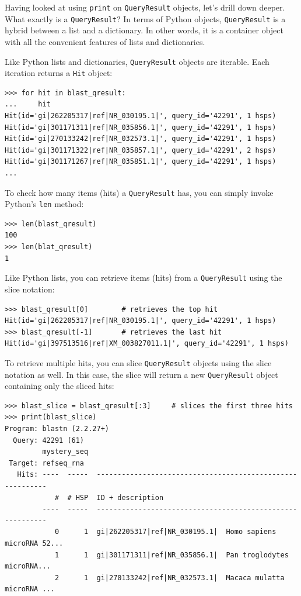 \documentclass{report}
\begin{document}
Having looked at using \verb|print| on \verb|QueryResult| objects, let's drill
down deeper. What exactly is a \verb|QueryResult|? In terms of Python objects,
\verb|QueryResult| is a hybrid between a list and a dictionary. In other words,
it is a container object with all the convenient features of lists and
dictionaries.

Like Python lists and dictionaries, \verb|QueryResult| objects are iterable.
Each iteration returns a \verb|Hit| object:

\begin{verbatim}
>>> for hit in blast_qresult:
...     hit
Hit(id='gi|262205317|ref|NR_030195.1|', query_id='42291', 1 hsps)
Hit(id='gi|301171311|ref|NR_035856.1|', query_id='42291', 1 hsps)
Hit(id='gi|270133242|ref|NR_032573.1|', query_id='42291', 1 hsps)
Hit(id='gi|301171322|ref|NR_035857.1|', query_id='42291', 2 hsps)
Hit(id='gi|301171267|ref|NR_035851.1|', query_id='42291', 1 hsps)
...
\end{verbatim}

To check how many items (hits) a \verb|QueryResult| has, you can simply invoke
Python's \verb|len| method:

\begin{verbatim}
>>> len(blast_qresult)
100
>>> len(blat_qresult)
1
\end{verbatim}

Like Python lists, you can retrieve items (hits) from a \verb|QueryResult| using
the slice notation:

\begin{verbatim}
>>> blast_qresult[0]        # retrieves the top hit
Hit(id='gi|262205317|ref|NR_030195.1|', query_id='42291', 1 hsps)
>>> blast_qresult[-1]       # retrieves the last hit
Hit(id='gi|397513516|ref|XM_003827011.1|', query_id='42291', 1 hsps)
\end{verbatim}

To retrieve multiple hits, you can slice \verb|QueryResult| objects using the
slice notation as well. In this case, the slice will return a new
\verb|QueryResult| object containing only the sliced hits:

\begin{verbatim}
>>> blast_slice = blast_qresult[:3]     # slices the first three hits
>>> print(blast_slice)
Program: blastn (2.2.27+)
  Query: 42291 (61)
         mystery_seq
 Target: refseq_rna
   Hits: ----  -----  ----------------------------------------------------------
            #  # HSP  ID + description                                          
         ----  -----  ----------------------------------------------------------
            0      1  gi|262205317|ref|NR_030195.1|  Homo sapiens microRNA 52...
            1      1  gi|301171311|ref|NR_035856.1|  Pan troglodytes microRNA...
            2      1  gi|270133242|ref|NR_032573.1|  Macaca mulatta microRNA ...
\end{verbatim}
\end{document}
